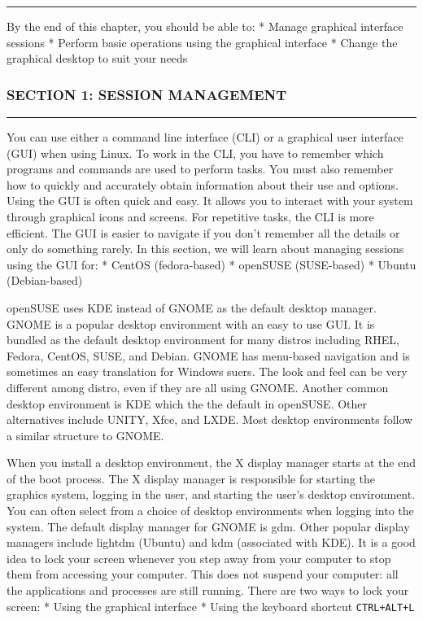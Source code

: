 \begin{center}\rule{3in}{0.4pt}\end{center}

By the end of this chapter, you should be able to: * Manage graphical
interface sessions * Perform basic operations using the graphical
interface * Change the graphical desktop to suit your needs

\subsubsection{SECTION 1: SESSION
MANAGEMENT}\label{section-1-session-management}

\begin{center}\rule{3in}{0.4pt}\end{center}

You can use either a command line interface (CLI) or a graphical user
interface (GUI) when using Linux. To work in the CLI, you have to
remember which programs and commands are used to perform tasks. You must
also remember how to quickly and accurately obtain information about
their use and options. Using the GUI is often quick and easy. It allows
you to interact with your system through graphical icons and screens.
For repetitive tasks, the CLI is more efficient. The GUI is easier to
navigate if you don't remember all the details or only do something
rarely. In this section, we will learn about managing sessions using the
GUI for: * CentOS (fedora-based) * openSUSE (SUSE-based) * Ubuntu
(Debian-based)

openSUSE uses KDE instead of GNOME as the default desktop manager. GNOME
is a popular desktop environment with an easy to use GUI. It is bundled
as the default desktop environment for many distros including RHEL,
Fedora, CentOS, SUSE, and Debian. GNOME has menu-based navigation and is
sometimes an easy translation for Windows suers. The look and feel can
be very different among distro, even if they are all using GNOME.
Another common desktop environment is KDE which the the default in
openSUSE. Other alternatives include UNITY, Xfce, and LXDE. Most desktop
environments follow a similar structure to GNOME.

When you install a desktop environment, the X display manager starts at
the end of the boot process. The X display manager is responsible for
starting the graphics system, logging in the user, and starting the
user's desktop environment. You can often select from a choice of
desktop environments when logging into the system. The default display
manager for GNOME is gdm. Other popular display managers include lightdm
(Ubuntu) and kdm (associated with KDE). It is a good idea to lock your
screen whenever you step away from your computer to stop them from
accessing your computer. This does not suspend your computer: all the
applications and processes are still running. There are two ways to lock
your screen: * Using the graphical interface * Using the keyboard
shortcut \texttt{CTRL+ALT+L}

